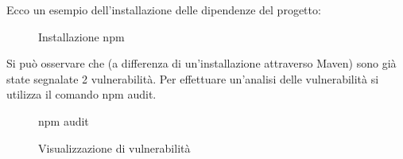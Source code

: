 Ecco un esempio dell’installazione delle dipendenze del progetto: 
\begin{figure}[H]
    \caption{Installazione npm }
    \label{fig:npmInstall}
\end{figure}
Si può osservare che (a differenza di un’installazione attraverso Maven) sono già state segnalate 2 vulnerabilità.
Per effettuare un’analisi delle vulnerabilità si utilizza il comando npm audit.
\begin{figure}[H]
    \caption{npm audit }
    \label{fig:npmAudit}
\end{figure}
\begin{figure}[H]
    \caption{Visualizzazione di vulnerabilità}
    \label{fig:viewVulnerability}
\end{figure}
